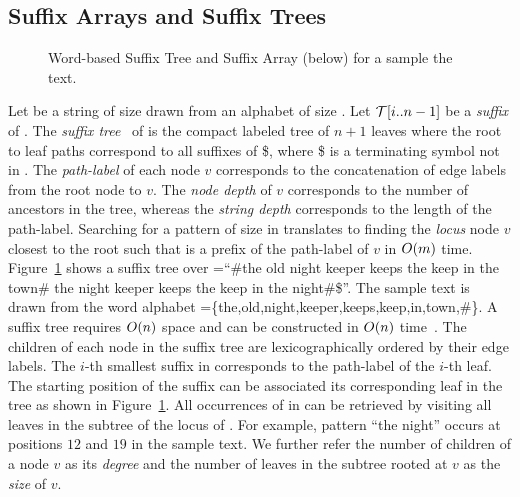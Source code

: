 
\subsection{Suffix Arrays and Suffix Trees}


\begin{figure}
\centering

\caption{Word-based Suffix Tree and Suffix Array (below) for a sample the 
text.}
\label{fig-suffix-tree}
\end{figure}

Let {\col} be a string of size {\collen} drawn from an alphabet {\alphabet} of
size {\alphabetsize}. Let {$\mathcal{T}[i..n-1]$} be a {\it suffix} of {\col}.
The {\it suffix tree}~\cite{w-swat73} of {\col} is the compact labeled
tree of $n+1$ leaves where the root to leaf paths correspond to all suffixes of {\col\$},
where \$ is a terminating symbol not in {\alphabet}. The {\it path-label}
of each node $v$ corresponds to the concatenation of edge labels from the
root node to $v$. The {\it node depth} of $v$ corresponds to the number
of ancestors in the tree, whereas the {\it string depth} corresponds to the
length of the path-label. Searching for a pattern {\pattern} of 
size {\plen} in {\col} translates to finding the {\it locus} node $v$ closest to
the root such that {\pattern} is a prefix of the path-label of $v$ in $O(m)$ time.
Figure~\ref{fig-suffix-tree} shows a suffix tree over {\col=``\#the old night keeper 
keeps the keep in the town\# the night keeper keeps the keep in the night\#\$}''. 
The sample text is drawn from the word alphabet 
{\alphabet=\{the,old,night,keeper,keeps,keep,in,town,\#\}}. A suffix tree requires $O(n)$ space 
and can be constructed in $O(n)$ time~\cite{u-algo95}. The children
of each node in the suffix tree are lexicographically ordered by their edge labels.
The $i$-th smallest suffix in {\col} corresponds to the path-label of the $i$-th 
leaf. The starting position of the suffix can be associated its corresponding
leaf in the tree as shown in Figure~\ref{fig-suffix-tree}. All 
occurrences of {\pattern} in {\col} can be retrieved by visiting all leaves
in the subtree of the locus of {\pattern}. For example, pattern ``the night'' occurs
at positions $12$ and $19$ in the sample text. We further refer the number of children
of a node $v$ as its {\it degree} and the number of leaves in the subtree rooted at $v$
as the {\it size} of $v$.

